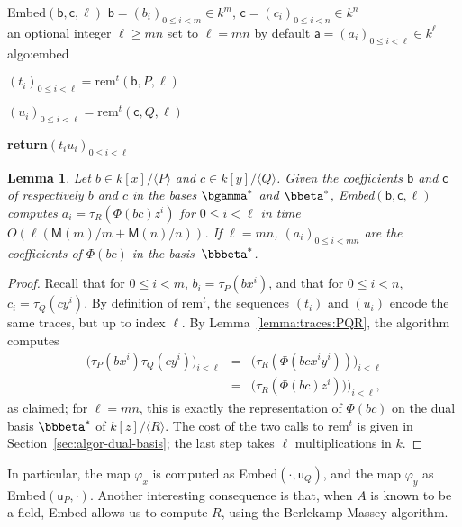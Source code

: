 \documentclass{sig-alternate}
\def\M {\ensuremath{\mathsf{M}}}
\def\va {\ensuremath{\mathsf{a}}}
\def\vu {\ensuremath{\mathsf{u}}}
\def\vb {\ensuremath{\mathsf{b}}}
\def\vc {\ensuremath{\mathsf{c}}}
\def\rem {\ensuremath{\mathrm{rem}}}
\newcounter{algo}
\newenvironment{algorithm_endline}[4]{\small\begin{center}\begin{minipage}{0.48\textwidth}
      \refstepcounter{algo}
      \label{#4}
      \sf
      \rule{\textwidth}{0.2pt}\\
      \makebox[\textwidth][c]{Algorithm~\arabic{algo}:~\textbf{#1}}\\
      \rule[0.5\baselineskip]{\textwidth}{0.2pt}\\

      \vspace{-12pt}

      \parbox{\textwidth}{\textbf{Input} #2}
      \parbox{\textwidth}{\textbf{Output} #3}

\vspace{-7pt}

      \begin{enumerate*}}{\end{enumerate*}
      \vspace{-11pt}
      \rule{\textwidth}{0.2pt}
\end{minipage}\end{center}
}
\newcommand{\ang}[1]{\langle#1\rangle}
\newtheorem{Lemma}{Lemma}
\begin{document}
\vspace{-5pt}

\begin{algorithm_endline}
{Embed$(\vb,\vc,\ell)$}
{$\vb=(b_i)_{0 \le i < m} \in k^m$, $\vc=(c_i)_{0 \le i < n} \in k^n$\\
    an optional integer $\ell \ge mn$ set to $\ell=mn$ by default}
{$\va=(a_i)_{0 \le i < \ell} \in k^{\ell}$}
{algo:embed}
\item $(t_i)_{0\le i<\ell} = \rem^t(\vb,P,\ell)$
\item $(u_i)_{0\le i<\ell} = \rem^t(\vc,Q,\ell)$
\item {\bf return}$(t_i u_i)_{0 \le i <\ell}$
\end{algorithm_endline}

\begin{Lemma}\label{lemma:algo:embed}
  Let $b \in k[x]/\ang{P}$ and $c \in k[y]/\ang{Q}$.  Given the
  coefficients $\vb$ and $\vc$ of respectively $b$ and $c$ in the
  bases $\bgamma^\ast$ and $\bbeta^\ast$, {\sf Embed}$(\vb,\vc,\ell)$
  computes $a_i=\tau_R\left(\Phi(bc)z^i\right)$ for $0 \le i < \ell$ in time
  $O(\ell(\M(m)/m+\M(n)/n))$. If $\ell=mn$, $(a_i)_{0 \le i < mn}$ are
  the coefficients of $\Phi(bc)$ in the basis~$\bbbeta^\ast$.
\end{Lemma}
\begin{proof}
  Recall that for $0 \le i <m$, $b_i = \tau_P(bx^i)$, and that for $0
  \le i < n$, $c_i = \tau_Q(cy^i)$. By definition of $\rem^t$, the
  sequences $(t_i)$ and $(u_i)$ encode the same traces, but up to
  index $\ell$.  By Lemma~\ref{lemma:traces:PQR}, the algorithm
  computes
  \begin{eqnarray*}
    \bigl(\tau_P(bx^i)\tau_Q(cy^i)\bigr)_{i<\ell} &=&  \bigl(\tau_R(\Phi(bc x^i y^i))\bigr)_{i<\ell}\\
    &=&  \bigl(\tau_R(\Phi(bc) z^i))\bigr)_{i<\ell},
  \end{eqnarray*}
  as claimed; for $\ell=mn$, this is exactly the representation of
  $\Phi(bc)$ on the dual basis $\bbbeta^\ast$ of $k[z]/\ang{R}$. The
  cost of the two calls to $\rem^t$ is given in
  Section~\ref{sec:algor-dual-basis}; the last step takes $\ell$
  multiplications in $k$.
\end{proof}

In particular, the map $\varphi_x$ is computed as
{\sf Embed}$(\cdot,\vu_Q)$, and the map $\varphi_y$ as
{\sf Embed}$(\vu_P,\cdot)$. Another interesting consequence is that, when
$A$ is known to be a field, {\sf Embed} allows us to compute $R$, using the
Berlekamp-Massey algorithm.
\end{document}
